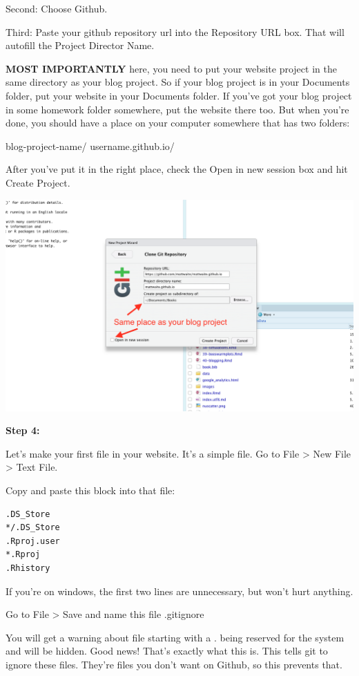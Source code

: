 \documentclass[
]{book}
\begin{document}
Second: Choose Github.

Third: Paste your github repository url into the Repository URL box. That will autofill the Project Director Name.

\textbf{MOST IMPORTANTLY} here, you need to put your website project in the same directory as your blog project. So if your blog project is in your Documents folder, put your website in your Documents folder. If you've got your blog project in some homework folder somewhere, put the website there too. But when you're done, you should have a place on your computer somewhere that has two folders:

blog-project-name/
username.github.io/

After you've put it in the right place, check the Open in new session box and hit Create Project.

\includegraphics[width=17.1in]{images/blog11}

\textbf{Step 4:}

Let's make your first file in your website. It's a simple file. Go to File \textgreater{} New File \textgreater{} Text File.

Copy and paste this block into that file:

\begin{verbatim}
.DS_Store
*/.DS_Store
.Rproj.user
*.Rproj
.Rhistory
\end{verbatim}

If you're on windows, the first two lines are unnecessary, but won't hurt anything.

Go to File \textgreater{} Save and name this file .gitignore

You will get a warning about file starting with a . being reserved for the system and will be hidden. Good news! That's exactly what this is. This tells git to ignore these files. They're files you don't want on Github, so this prevents that.
\end{document}
